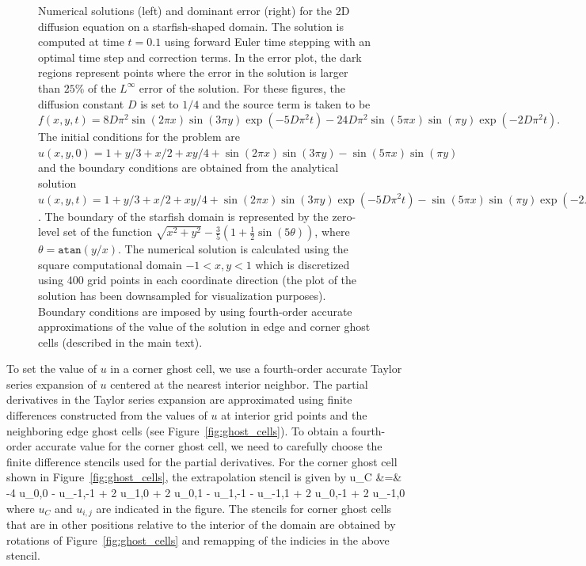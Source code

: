 \documentclass[oneeqnum,onefignum,onetabnum,onethmnum]{siamltex}
\begin{document}
\begin{figure}[tb]
\begin{center}
\caption{Numerical solutions (left) and dominant error (right) for the 2D 
diffusion equation on a starfish-shaped domain.  The solution is computed at 
time $t = 0.1$ using forward Euler time stepping with an optimal time step 
and correction terms.  In the error plot, the dark regions represent points 
where the error in the solution is larger than $25$\% of the $L^\infty$ error 
of the solution.  For these figures, the diffusion constant $D$ is set to 
$1/4$ and the source term is taken to be 
$f(x,y,t) = 8 D \pi^2 \sin(2 \pi x) \sin(3 \pi y) 
            \exp\left(-5 D \pi^2 t\right)
          - 24 D \pi^2 \sin(5 \pi x) \sin(\pi y) 
            \exp \left(-2 D \pi^2 t \right).
$
The initial conditions for the problem are 
$u(x,y,0) = 1 + y/3 + x/2 + xy/4 
          + \sin(2 \pi x) \sin(3 \pi y) 
          - \sin(5 \pi x) \sin(\pi y)
$
and the boundary conditions are obtained from the analytical solution
$u(x,y,t) = 1 + y/3 + x/2 + xy/4 
              + \sin(2 \pi x) \sin(3 \pi y) \exp(-5 D \pi^2 t) 
              - \sin(5 \pi x) \sin(\pi y) \exp(-2 D \pi^2 t)
$.
The boundary of the starfish domain is represented by the zero-level set of 
the function
$\sqrt{x^2 + y^2} - \frac{3}{5} \left(1 + \frac{1}{2}\sin(5 \theta) \right)$, 
where $\theta = \mathtt{atan}\left( y/x \right)$.
The numerical solution is calculated using the square computational domain 
$-1 < x,y < 1$ which is discretized using 400 grid points in each coordinate 
direction (the plot of the solution has been downsampled for visualization 
purposes).  Boundary conditions are imposed by using fourth-order accurate
approximations of the value of the solution in edge and corner ghost cells
(described in the main text).
}
\label{fig:diffusion_eqn_2d_starfish_domain}
\end{center}
\end{figure}

To set the value of $u$ in a corner ghost cell, we use a fourth-order accurate
Taylor series expansion of $u$ centered at the nearest interior 
neighbor.  The partial derivatives in the Taylor series expansion are 
approximated using finite differences constructed from the values of $u$ 
at interior grid points and the neighboring edge ghost cells (see 
Figure~\ref{fig:ghost_cells}).  To obtain a fourth-order accurate value for 
the corner ghost cell, we need to carefully choose the finite difference 
stencils used for the partial derivatives.  For the corner ghost cell shown 
in Figure~\ref{fig:ghost_cells}, the extrapolation stencil is given by
\bea
  u_C &=&  -4 u_{0,0} - u_{-1,-1} + 2 u_{1,0} + 2 u_{0,1}
      - u_{1,-1} - u_{-1,1} + 2 u_{0,-1} + 2 u_{-1,0}
\eea
where $u_C$ and $u_{i,j}$ are indicated in the figure.  The stencils for
corner ghost cells that are in other positions relative to the interior of 
the domain are obtained by rotations of Figure~\ref{fig:ghost_cells} and 
remapping of the indicies in the above stencil.
\end{document}
